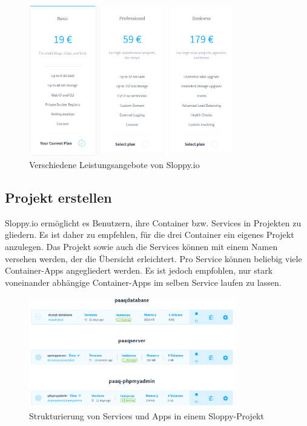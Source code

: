 \documentclass[../main.tex]{subfiles}
\begin{document}
	\begin{figure}[H]
		\centering
		\includegraphics[width=0.8\textwidth]{../images/SloppyProductPlans} 
		\caption{Verschiedene Leistungsangebote von Sloppy.io}
		\label{fig:SloppyProductPlans}
	\end{figure}

	\subsection{Projekt erstellen}
	Sloppy.io ermöglicht es Benutzern, ihre Container bzw. Services in Projekten zu gliedern. Es ist daher zu empfehlen, für die drei Container ein eigenes Projekt anzulegen. Das Projekt sowie auch die Services können mit einem Namen versehen werden, der die Übersicht erleichtert. Pro Service können beliebig viele Container-Apps angegliedert werden. Es ist jedoch empfohlen, nur stark voneinander abhängige Container-Apps im selben Service laufen zu lassen.
	
	\begin{figure}[H]
		\centering
		\includegraphics[width=0.8\textwidth]{../images/SloppyProjectStructure} 
		\caption{Strukturierung von Services und Apps in einem Sloppy-Projekt}
		\label{fig:SloppyProjectStructure}
	\end{figure}
	
\end{document}
